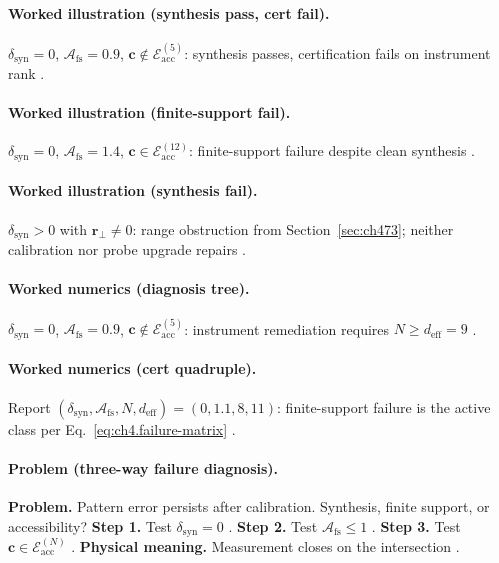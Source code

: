 \paragraph{Worked illustration (synthesis pass, cert fail).}
\(\delta_{\mathrm{syn}}=0\), \(\mathcal{A}_{\mathrm{fs}}=0.9\), \(\mathbf{c}\notin\mathcal{E}_{\mathrm{acc}}^{(5)}\): synthesis passes, certification fails on
instrument rank \cite{harrington2001,stratton1941,devaney2004,hansen1988}.

\paragraph{Worked illustration (finite-support fail).}
\(\delta_{\mathrm{syn}}=0\), \(\mathcal{A}_{\mathrm{fs}}=1.4\), \(\mathbf{c}\in\mathcal{E}_{\mathrm{acc}}^{(12)}\): finite-support failure despite clean synthesis
\cite{hansen1988,stratton1941,harrington2001,jackson1999}.

\paragraph{Worked illustration (synthesis fail).}
\(\delta_{\mathrm{syn}}>0\) with \(\mathbf{r}_{\perp}\neq0\): range obstruction from Section~\ref{sec:ch473}; neither calibration nor probe upgrade repairs
\cite{harrington2001,devaney2004,stratton1941}.

\paragraph{Worked numerics (diagnosis tree).}
\(\delta_{\mathrm{syn}}=0\), \(\mathcal{A}_{\mathrm{fs}}=0.9\), \(\mathbf{c}\notin\mathcal{E}_{\mathrm{acc}}^{(5)}\): instrument remediation requires \(N\ge d_{\mathrm{eff}}=9\)
\cite{harrington2001,hansen1988,devaney2004,collin2001}.

\paragraph{Worked numerics (cert quadruple).}
Report \((\delta_{\mathrm{syn}},\mathcal{A}_{\mathrm{fs}},N,d_{\mathrm{eff}})=(0,1.1,8,11)\): finite-support failure is the active class per
Eq.~\eqref{eq:ch4.failure-matrix} \cite{stratton1941,hansen1988,harrington2001,jackson1999}.

\paragraph{Problem (three-way failure diagnosis).}
\textbf{Problem.} Pattern error persists after calibration. Synthesis, finite support, or accessibility?
\textbf{Step 1.} Test \(\delta_{\mathrm{syn}}=0\) \cite{stratton1941,harrington2001}.
\textbf{Step 2.} Test \(\mathcal{A}_{\mathrm{fs}}\le1\) \cite{hansen1988,devaney2004}.
\textbf{Step 3.} Test \(\mathbf{c}\in\mathcal{E}_{\mathrm{acc}}^{(N)}\) \cite{jackson1999,collin2001}.
\textbf{Physical meaning.} Measurement closes on the intersection \cite{stratton1941,harrington2001}.


